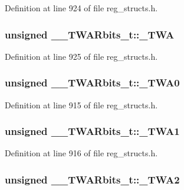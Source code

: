 Definition at line 924 of file reg\+\_\+structs.\+h.

\hypertarget{union_____t_w_a_rbits__t_a7c9cbfd889b9879a1f40483dd7c6babd}{
\subsubsection[{\+\_\+\+T\+W\+A}]{\setlength{\rightskip}{0pt plus 5cm}unsigned \+\_\+\+\_\+\+T\+W\+A\+Rbits\+\_\+t\+::\+\_\+\+T\+W\+A}}\label{union_____t_w_a_rbits__t_a7c9cbfd889b9879a1f40483dd7c6babd}


Definition at line 925 of file reg\+\_\+structs.\+h.

\hypertarget{union_____t_w_a_rbits__t_a2b79f05616a44f3b8597df0852ee050c}{
\subsubsection[{\+\_\+\+T\+W\+A0}]{\setlength{\rightskip}{0pt plus 5cm}unsigned \+\_\+\+\_\+\+T\+W\+A\+Rbits\+\_\+t\+::\+\_\+\+T\+W\+A0}}\label{union_____t_w_a_rbits__t_a2b79f05616a44f3b8597df0852ee050c}


Definition at line 915 of file reg\+\_\+structs.\+h.

\hypertarget{union_____t_w_a_rbits__t_ae70907d38eee68d038bcb5f78b59586d}{
\subsubsection[{\+\_\+\+T\+W\+A1}]{\setlength{\rightskip}{0pt plus 5cm}unsigned \+\_\+\+\_\+\+T\+W\+A\+Rbits\+\_\+t\+::\+\_\+\+T\+W\+A1}}\label{union_____t_w_a_rbits__t_ae70907d38eee68d038bcb5f78b59586d}


Definition at line 916 of file reg\+\_\+structs.\+h.

\hypertarget{union_____t_w_a_rbits__t_a2b95119bab245c7a20fe550c52dc6bce}{
\subsubsection[{\+\_\+\+T\+W\+A2}]{\setlength{\rightskip}{0pt plus 5cm}unsigned \+\_\+\+\_\+\+T\+W\+A\+Rbits\+\_\+t\+::\+\_\+\+T\+W\+A2}}\label{union_____t_w_a_rbits__t_a2b95119bab245c7a20fe550c52dc6bce}


